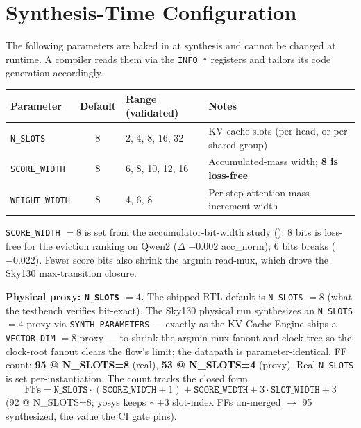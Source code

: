 \documentclass[11pt]{article}
\begin{document}
\section{Synthesis-Time Configuration}
\label{sec:syntime}

The following parameters are baked in at synthesis and cannot be changed at
runtime. A compiler reads them via the \texttt{INFO\_*} registers and tailors its
code generation accordingly.

\begin{table}[h]
\centering
\small
\begin{tabular}{@{}l c l p{5.5cm}@{}}
\toprule
Parameter          & Default & Range (validated)      & Notes \\
\midrule
\texttt{N\_SLOTS}     & 8 & 2, 4, 8, 16, 32   & KV-cache slots (per head, or per shared group) \\
\texttt{SCORE\_WIDTH} & 8 & 6, 8, 10, 12, 16  & Accumulated-mass width; \textbf{8 is loss-free} \\
\texttt{WEIGHT\_WIDTH}& 8 & 4, 6, 8           & Per-step attention-mass increment width \\
\bottomrule
\end{tabular}
\end{table}

\noindent \texttt{SCORE\_WIDTH} $=8$ is set from the accumulator-bit-width study
(): 8 bits is loss-free for the eviction
ranking on Qwen2 ($\Delta$ $-0.002$ acc\_norm); 6 bits breaks ($-0.022$). Fewer
score bits also shrink the argmin read-mux, which drove the Sky130 max-transition
closure.

\medskip
\noindent\textbf{Physical proxy: \texttt{N\_SLOTS} $=4$.} The shipped RTL default
is \texttt{N\_SLOTS} $=8$ (what the testbench verifies bit-exact). The Sky130
physical run synthesizes an \texttt{N\_SLOTS} $=4$ proxy via
\texttt{SYNTH\_PARAMETERS} --- exactly as the KV Cache Engine ships a
\texttt{VECTOR\_DIM} $=8$ proxy --- to shrink the argmin-mux fanout and clock
tree so the clock-root fanout clears the flow's limit; the datapath is
parameter-identical. FF count: \textbf{95 @ N\_SLOTS=8} (real),
\textbf{53 @ N\_SLOTS=4} (proxy). Real \texttt{N\_SLOTS} is set
per-instantiation. The count tracks the closed form
\[
  \mathrm{FFs} = \texttt{N\_SLOTS}\cdot(\texttt{SCORE\_WIDTH}{+}1) + \texttt{SCORE\_WIDTH} + 3\cdot\texttt{SLOT\_WIDTH} + 3
\]
(92 @ N\_SLOTS=8; yosys keeps $\sim{+}3$ slot-index FFs un-merged $\to$ 95
synthesized, the value the CI gate pins).
\end{document}

